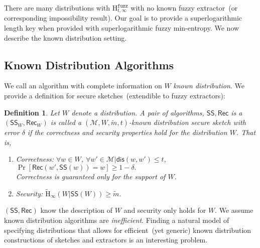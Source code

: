 \documentclass[11pt]{article}
\newcommand{\lemref}[1]{\mbox{Lemma~\ref{#1}}}
\newcommand{\class}[1]{{\ensuremath{\mathsf{#1}}}}
\newcommand{\sketch}{\ensuremath{\class{SS}}\xspace}
\newcommand{\rec}{\ensuremath{\class{Rec}}\xspace}
\newcommand{\dis}{\ensuremath{\mathsf{dis}}}
\newcommand{\Hav}{\tilde{\mathrm{H}}_\infty}
\newcommand{\Hfuzz}{\mathrm{H}^{\mathtt{fuzz}}_{t,\infty}}
\newtheorem{definition}[theorem]{Definition}
\begin{document}
\noindent
There are many distributions with $\Hfuzz$ with no known fuzzy extractor~(or corresponding impossibility result).
Our goal is to provide a superlogarithmic length key when provided with superlogarithmic fuzzy min-entropy.  We now describe the known distribution setting.

\subsection{Known Distribution Algorithms}
\label{sec:known distributions def}
We call an algorithm with complete information on $W$ \emph{known distribution}.  We provide a definition for secure sketches~(extendible to fuzzy extractors):

\begin{definition}
Let $W$ denote a distribution.  A pair of algorithms, $\sketch, \rec$ is a $(\sketch_W, \rec_W)$ is called a $(\mathcal{M}, W, \tilde{m}, t)$-\emph{known distribution secure sketch} with error $\delta$ if the correctness and security properties hold for the distribution $W$.  That is, 
\begin{enumerate}
\item \emph{Correctness:} 
$
\forall w\in W$, $\forall w' \in\mathcal{M}| \dis(w,w')\le t$, $\Pr[\rec(w',\sketch(w))=w]\ge 1-\delta.$\\
Correctness is guaranteed only for the support of $W$.
\item \emph{Security:} $\Hav(W|\sketch(W))\geq \tilde{m}$.
\end{enumerate}
\end{definition}
$(\sketch, \rec)$ know the description of $W$ and security only holds for $W$.  We assume known distribution algorithms are \emph{inefficient}.  Finding a natural model of specifying distributions that allows for efficient~(yet generic) known distribution constructions of sketches and extractors is an interesting problem.
\end{document}
